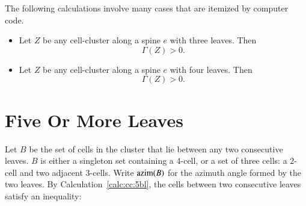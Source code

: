\begin{calculation}\label{calc:shorts}\cutrate{}
The following calculations involve many cases that are itemized by
computer code.
\begin{itemize}\wasitemize 
\item {} Let $Z$ be any cell-cluster along a spine $e$
with three leaves.  Then
\[ 
\Gamma(Z)> 0.
\] 
\item {} Let $Z$ be any cell-cluster along a spine $e$
with four leaves.  Then
\[ 
\Gamma(Z)> 0.
\] 
\end{itemize}\wasitemize 
\end{calculation}





%
%
%

\section{Five Or More Leaves}


Let $B$ be the set of cells in the cluster that lie between any two
consecutive leaves.  $B$ is either a singleton set containing a
$4$-cell, or a set of three cells: a $2$-cell and two adjacent
$3$-cells.  Write ${\operatorname{azim}}(B)$ for the azimuth angle formed by the
two leaves.  By Calculation~\ref{calc:cc:5bl}, the cells between two
consecutive leaves satisfy an
inequality: %


